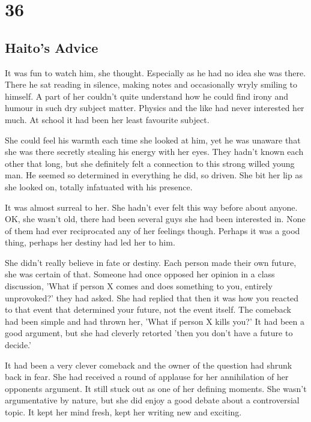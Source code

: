 \chapter{36}
\section{Haito's Advice}


It was fun to watch him, she thought.  Especially as he had no idea she was there.  There he sat reading in silence, making notes and occasionally wryly smiling to himself.  A part of her couldn't quite understand how he could find irony and humour in such dry subject matter.  Physics and the like had never interested her much.  At school it had been her least favourite subject.

She could feel his warmth each time she looked at him, yet he was unaware that she was there secretly stealing his energy with her eyes.  They hadn't known each other that long, but she definitely felt a connection to this strong willed young man.  He seemed so determined in everything he did, so driven.  She bit her lip as she looked on, totally infatuated with his presence.  

It was almost surreal to her.  She hadn't ever felt this way before about anyone.  OK, she wasn't old, there had been several guys she had been interested in.  None of them had ever reciprocated any of her feelings though.  Perhaps it was a good thing, perhaps her destiny had led her to him.

She didn't really believe in fate or destiny.  Each person made their own future, she was certain of that.  Someone had once opposed her opinion in a class discussion, 'What if person X comes and does something to you, entirely unprovoked?' they had asked.  She had replied that then it was how you reacted to that event that determined your future, not the event itself.  The comeback had been simple and had thrown her, 'What if person X kills you?'  It had been a good argument, but she had cleverly retorted 'then you don't have a future to decide.'

It had been a very clever comeback and the owner of the question had shrunk back in fear.  She had received a round of applause for her annihilation of her opponents argument.  It still stuck out as one of her defining moments.  She wasn't argumentative by nature, but she did enjoy a good debate about a controversial topic.  It kept her mind fresh, kept her writing new and exciting.


